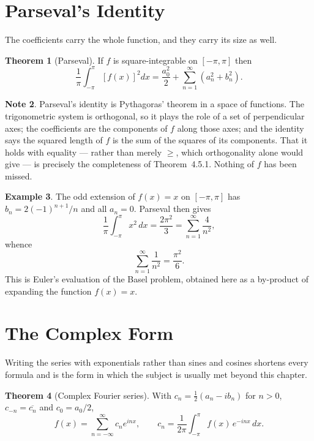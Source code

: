\documentclass[12pt,a4paper]{report}
\theoremstyle{definition}
\newtheorem{thm}{Theorem}[section]
\newtheorem{exa}[thm]{Example}
\newtheorem{note}[thm]{Note}
\theoremstyle{plain}
\begin{document}
\section{Parseval's Identity}

The coefficients carry the whole function, and they carry its size as well.

\begin{thm}[Parseval]
\label{thm:parseval}
If $f$ is square-integrable on $[-\pi,\pi]$ then
$$\frac{1}{\pi}\int^{\pi}_{-\pi}\left[f(x)\right]^{2}dx
= \frac{a_0^{2}}{2} + \sum^{\infty}_{n=1}\left(a_n^{2}+b_n^{2}\right).$$
\end{thm}

\begin{note}
Parseval's identity is Pythagoras' theorem in a space of functions. The
trigonometric system is orthogonal, so it plays the role of a set of
perpendicular axes; the coefficients are the components of $f$ along those axes;
and the identity says the squared length of $f$ is the sum of the squares of its
components. That it holds with equality --- rather than merely $\geq$, which
orthogonality alone would give --- is precisely the completeness of
Theorem~4.5.1. Nothing of $f$ has been missed.
\end{note}

\begin{exa}
The odd extension of $f(x)=x$ on $[-\pi,\pi]$ has $b_n = 2(-1)^{n+1}/n$ and all
$a_n=0$. Parseval then gives
$$\frac{1}{\pi}\int^{\pi}_{-\pi}x^{2}\,dx = \frac{2\pi^{2}}{3}
= \sum^{\infty}_{n=1}\frac{4}{n^{2}},$$
whence
$$\sum^{\infty}_{n=1}\frac{1}{n^{2}} = \frac{\pi^{2}}{6}.$$
This is Euler's evaluation of the Basel problem, obtained here as a by-product
of expanding the function $f(x)=x$.
\end{exa}

\section{The Complex Form}

Writing the series with exponentials rather than sines and cosines shortens
every formula and is the form in which the subject is usually met beyond this
chapter.

\begin{thm}[Complex Fourier series]
With $c_n = \tfrac12\left(a_n - i b_n\right)$ for $n>0$,
$c_{-n} = \overline{c_n}$ and $c_0 = a_0/2$,
$$f(x) = \sum^{\infty}_{n=-\infty}c_n e^{inx},
\qquad
c_n = \frac{1}{2\pi}\int^{\pi}_{-\pi}f(x)\,e^{-inx}\,dx .$$
\end{thm}
\end{document}
